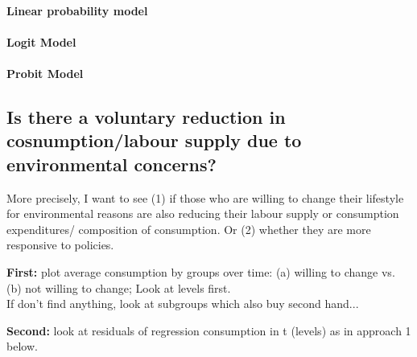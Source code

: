 \documentclass[12pt]{article}
\begin{document}
\paragraph{Linear probability model}
\paragraph{Logit Model}
\paragraph{Probit Model}

\subsection{Is there a voluntary reduction in cosnumption/labour supply due to environmental concerns?}

More precisely, I want to see (1) if those who are willing to change their lifestyle for environmental reasons are also reducing their labour supply or consumption expenditures/ composition of consumption. 
Or (2) whether they are more responsive to policies. 

\textbf{First:} plot average consumption by groups over time: (a) willing to change vs. (b) not willing to change; 
Look at levels first.\\ If don't find anything, look at subgroups which also buy second hand...

\textbf{Second:} look at residuals of regression consumption in t (levels) as in approach 1 below. 
\end{document}
